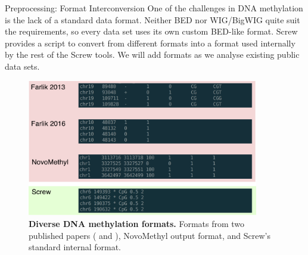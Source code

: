 \documentclass{beamer}
\begin{document}
\begin{frame}
\begin{columns}[t]
\begin{column}{.65\textwidth}
\begin{columns}[t,totalwidth=\textwidth]
\begin{column}{.48\textwidth}
\begin{block}{Preprocessing: Format Interconversion}
	One of the challenges in DNA methylation is the lack of a standard data format. Neither BED nor WIG/BigWIG quite suit the requirements, so every data set uses its own custom BED-like format. Screw provides a script to convert from different formats into a format used internally by the rest of the Screw tools. We will add formats as we analyse existing public data sets. 
\begin{figure}
\begin{center}
\includegraphics[width=0.9\textwidth]{figures/data_types.pdf}
\caption{\textbf{Diverse DNA methylation formats.} Formats from two published papers (\cite{Farlik2013} and \cite{Farlik2016}), NovoMethyl output format, and Screw's standard internal format.}
\end{center}
\end{figure}

\end{block}


\end{column}
\end{columns}
\end{column}
\end{columns}
\end{frame}
\end{document}
